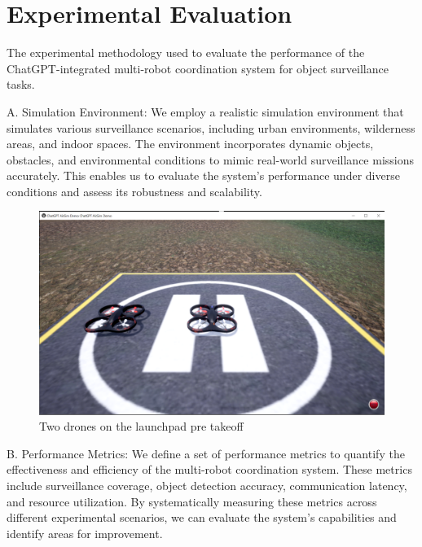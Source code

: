 \documentclass[journal]{IEEEtran}
\begin{document}
\section{Experimental Evaluation}

 The experimental methodology used to evaluate the performance of the ChatGPT-integrated multi-robot coordination system for object surveillance tasks.

A. Simulation Environment: We employ a realistic simulation environment that simulates various surveillance scenarios, including urban environments, wilderness areas, and indoor spaces. The environment incorporates dynamic objects, obstacles, and environmental conditions to mimic real-world surveillance missions accurately. This enables us to evaluate the system's performance under diverse conditions and assess its robustness and scalability.
\begin{figure}[h]
    \centering
    \includegraphics[width=1\linewidth]{2drones.PNG}
    \caption{Two drones on the launchpad pre takeoff}
    \label{fig:enter-label}
\end{figure}
B. Performance Metrics: We define a set of performance metrics to quantify the effectiveness and efficiency of the multi-robot coordination system. These metrics include surveillance coverage, object detection accuracy, communication latency, and resource utilization. By systematically measuring these metrics across different experimental scenarios, we can evaluate the system's capabilities and identify areas for improvement.
\end{document}
